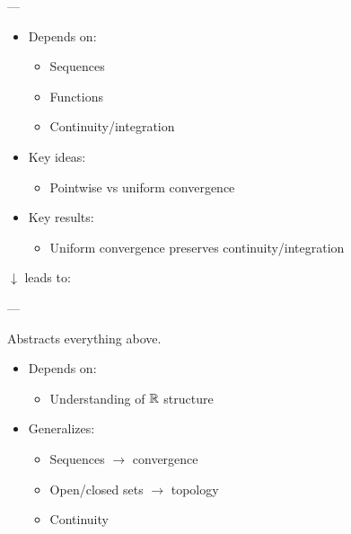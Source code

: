 \documentclass[12pt,a4paper]{report}
\begin{document}
\begin{description}
---

\item {}

	\begin{itemize}
    \item Depends on:

		\begin{itemize}
        \item Sequences
        \item Functions
        \item Continuity/integration
		\end{itemize}

    \item Key ideas:

		\begin{itemize}
        \item Pointwise vs uniform convergence
		\end{itemize}

    \item Key results:

		\begin{itemize}
        \item Uniform convergence preserves continuity/integration
		\end{itemize}

	\end{itemize}
$\downarrow$ leads to:

---

\item {}

Abstracts everything above.

	\begin{itemize}
    \item Depends on:

		\begin{itemize}
        \item Understanding of $\mathbb{R}$ structure
		\end{itemize}

    \item Generalizes:

		\begin{itemize}
        \item Sequences $\to$ convergence
        \item Open/closed sets $\to$ topology
        \item Continuity
		\end{itemize}


\end{itemize}
\end{description}
\end{document}
